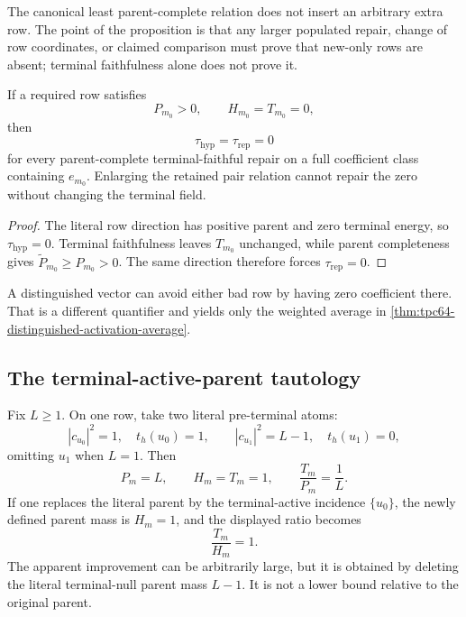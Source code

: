 The canonical least parent-complete relation does not insert an arbitrary
extra row.  The point of the proposition is that any larger populated
repair, change of row coordinates, or claimed comparison must prove that
new-only rows are absent; terminal faithfulness alone does not prove it.

\begin{proposition}
\label{prop:tpc64-countermodel-terminal-zero-row}
If a required row satisfies
\begin{equation}
 P_{m_0}>0,\qquad H_{m_0}=T_{m_0}=0,
 \label{eq:tpc64-countermodel-terminal-zero-data}
\end{equation}
then
\begin{equation}
 \tau_{\mathrm{hyp}}=\tau_{\mathrm{rep}}=0
 \label{eq:tpc64-countermodel-terminal-zero-death}
\end{equation}
for every parent-complete terminal-faithful repair on a full coefficient
class containing \(e_{m_0}\).  Enlarging the retained pair relation cannot
repair the zero without changing the terminal field.
\end{proposition}

\begin{proof}
The literal row direction has positive parent and zero terminal energy,
so \(\tau_{\mathrm{hyp}}=0\).  Terminal faithfulness leaves \(T_{m_0}\)
unchanged, while parent completeness gives
\(\widetilde P_{m_0}\ge P_{m_0}>0\).  The same direction therefore forces
\(\tau_{\mathrm{rep}}=0\).
\end{proof}

A distinguished vector can avoid either bad row by having zero coefficient
there.  That is a different quantifier and yields only the weighted average
in \cref{thm:tpc64-distinguished-activation-average}.

\subsection{The terminal-active-parent tautology}

\begin{example}
\label{ex:tpc64-terminal-active-parent-tautology}
Fix \(L\ge1\).  On one row, take two literal pre-terminal atoms:
\[
 |c_{u_0}|^2=1,\quad t_h(u_0)=1,
 \qquad
 |c_{u_1}|^2=L-1,\quad t_h(u_1)=0,
\]
omitting \(u_1\) when \(L=1\).  Then
\begin{equation}
 P_m=L,\qquad H_m=T_m=1,
 \qquad
 \frac{T_m}{P_m}=\frac1L.
 \label{eq:tpc64-tautology-true-activation}
\end{equation}
If one replaces the literal parent by the terminal-active incidence
\(\{u_0\}\), the newly defined parent mass is \(H_m=1\), and the displayed
ratio becomes
\begin{equation}
 \frac{T_m}{H_m}=1.
 \label{eq:tpc64-tautology-false-parent-ratio}
\end{equation}
The apparent improvement can be arbitrarily large, but it is obtained by
deleting the literal terminal-null parent mass \(L-1\).  It is not a lower
bound relative to the original parent.
\end{example}

